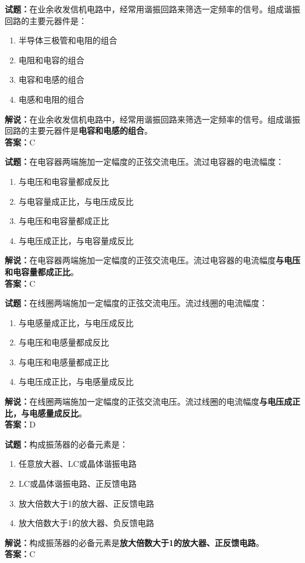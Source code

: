 \documentclass{ctexbook}
\begin{document}
\bigskip


\noindent\textbf{试题：}在业余收发信机电路中，经常用谐振回路来筛选一定频率的信号。组成谐振回路的主要元器件是：
\begin{enumerate}[leftmargin=3em]
\item 半导体三极管和电阻的组合
\item 电阻和电容的组合
\item 电容和电感的组合
\item 电感和电阻的组合
\end{enumerate}
\noindent\textbf{解说：}在业余收发信机电路中，经常用谐振回路来筛选一定频率的信号。组成谐振回路的主要元器件是\textbf{电容和电感的组合}。\\\noindent\textbf{答案：}C



\bigskip


\noindent\textbf{试题：}在电容器两端施加一定幅度的正弦交流电压。流过电容器的电流幅度：
\begin{enumerate}[leftmargin=3em]
\item 与电压和电容量都成反比
\item 与电容量成正比，与电压成反比
\item 与电压和电容量都成正比
\item 与电压成正比，与电容量成反比
\end{enumerate}
\noindent\textbf{解说：}在电容器两端施加一定幅度的正弦交流电压。流过电容器的电流幅度\textbf{与电压和电容量都成正比}。\\\noindent\textbf{答案：}C


\bigskip


\noindent\textbf{试题：}在线圈两端施加一定幅度的正弦交流电压。流过线圈的电流幅度：
\begin{enumerate}[leftmargin=3em]
\item 与电感量成正比，与电压成反比
\item 与电压和电感量都成反比
\item 与电压和电感量都成正比
\item 与电压成正比，与电感量成反比
\end{enumerate}
\noindent\textbf{解说：}在线圈两端施加一定幅度的正弦交流电压。流过线圈的电流幅度\textbf{与电压成正比，与电感量成反比}。\\\noindent\textbf{答案：}D

\bigskip


\noindent\textbf{试题：}构成振荡器的必备元素是：
\begin{enumerate}[leftmargin=3em]
\item 任意放大器、LC或晶体谐振电路
\item LC或晶体谐振电路、正反馈电路
\item 放大倍数大于1的放大器、正反馈电路
\item 放大倍数大于1的放大器、负反馈电路
\end{enumerate}
\noindent\textbf{解说：}构成振荡器的必备元素是\textbf{放大倍数大于1的放大器、正反馈电路}。\\\noindent\textbf{答案：}C
\end{document}
